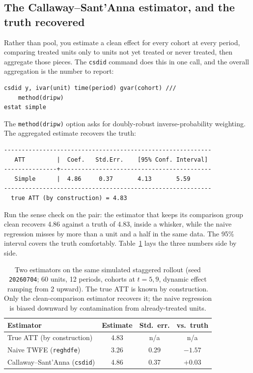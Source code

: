 \subsection{The Callaway--Sant'Anna estimator, and the truth recovered}
Rather than pool, you estimate a clean effect for every cohort at every period, comparing treated units only to units not yet treated or never treated, then aggregate those pieces. The \texttt{csdid} command does this in one call, and the overall aggregation is the number to report:
\par
{\footnotesize
\begin{verbatim}
csdid y, ivar(unit) time(period) gvar(cohort) ///
    method(dripw)
estat simple
\end{verbatim}
}
The \texttt{method(dripw)} option asks for doubly-robust inverse-probability weighting. The aggregated estimate recovers the truth:
\par
{\footnotesize
\begin{verbatim}
-----------------------------------------------------------
   ATT         |  Coef.   Std.Err.    [95% Conf. Interval]
---------------+-------------------------------------------
   Simple      |  4.86     0.37       4.13       5.59
-----------------------------------------------------------
  true ATT (by construction) = 4.83
\end{verbatim}
}
Run the sense check on the pair: the estimator that keeps its comparison group clean recovers 4.86 against a truth of 4.83, inside a whisker, while the naive regression misses by more than a unit and a half in the same data. The 95\% interval covers the truth comfortably. Table~\ref{tab:did-compare} lays the three numbers side by side.

\begin{table}[htbp]
\centering
\caption[TWFE vs.\ Callaway--Sant'Anna on a known truth]{Two estimators on the same simulated staggered rollout (seed \texttt{20260704}; 60 units, 12 periods, cohorts at $t{=}5,9$, dynamic effect ramping from 2 upward). The true ATT is known by construction. Only the clean-comparison estimator recovers it; the naive regression is biased downward by contamination from already-treated units.}
\label{tab:did-compare}
{\footnotesize
\begin{tabular}{lccc}
\hline
Estimator & Estimate & Std.\ err. & vs.\ truth \\
\hline
True ATT (by construction) & 4.83 & n/a & n/a \\
Naive TWFE (\texttt{reghdfe}) & 3.26 & 0.29 & $-1.57$ \\
Callaway--Sant'Anna (\texttt{csdid}) & 4.86 & 0.37 & $+0.03$ \\
\hline
\end{tabular}
}
\end{table}

